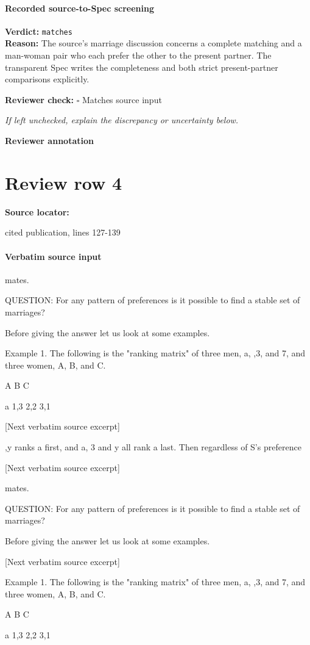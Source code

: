 \documentclass[10pt]{article}
\newcommand{\reviewerbox}{%
  \par\noindent\fbox{\parbox{0.96\linewidth}{\rule{0pt}{0.38in}}}\par
}
\newcommand{\reviewmatch}[1]{%
  \par\noindent\textbf{Reviewer check:} $\square$\; #1\par
  \noindent\emph{If left unchecked, explain the discrepancy or uncertainty below.}\par
}
\begin{document}
\paragraph{Recorded source-to-Spec screening}
\textbf{Verdict:} \texttt{matches}
\\
\textbf{Reason:} The source's marriage discussion concerns a complete matching and a man-woman pair who each prefer the other to the present partner. The transparent Spec writes the completeness and both strict present-partner comparisons explicitly.
\reviewmatch{Matches source input}
\noindent\textbf{Reviewer annotation}\par
\reviewerbox
\clearpage
\hypertarget{source-claim-e6bf09e833b5d546}{}
\section*{Review row 4}
\textbf{Source locator:} {\footnotesize\raggedright cited publication, lines 127-\allowbreak{}139\par}
\paragraph{Verbatim source input}
\begin{ReviewVerbatim}
mates.

   QUESTION: For any pattern of preferences is it possible to find a stable set of
marriages?

   Before giving the answer let us look at some examples.

   Example 1. The following is the "ranking matrix" of three men, a, ,3, and 7,
and three women, A, B, and C.

                                        A        B       C

                              a 1,3 2,2 3,1

[Next verbatim source excerpt]

,y ranks a first, and a, 3 and y all rank a last. Then regardless of S's preference

[Next verbatim source excerpt]

mates.

   QUESTION: For any pattern of preferences is it possible to find a stable set of
marriages?

   Before giving the answer let us look at some examples.

[Next verbatim source excerpt]


   Example 1. The following is the "ranking matrix" of three men, a, ,3, and 7,
and three women, A, B, and C.

                                        A        B       C

                              a 1,3 2,2 3,1
\end{ReviewVerbatim}
\end{document}
